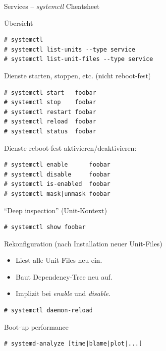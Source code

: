 \begin{frame}{Services --
  \emph{systemctl} Cheatsheet}
\begin{block}{Übersicht}
\begin{lstlisting}
# systemctl
# systemctl list-units --type service
# systemctl list-unit-files --type service
\end{lstlisting}
\end{block}

\begin{block}{Dienste starten, stoppen, etc. (nicht reboot-fest)}
\begin{lstlisting}
# systemctl start   foobar
# systemctl stop    foobar
# systemctl restart foobar
# systemctl reload  foobar
# systemctl status  foobar
\end{lstlisting}
\end{block}

\framebreak
\begin{block}{Dienste reboot-fest aktivieren/deaktivieren:}
\begin{lstlisting}
# systemctl enable      foobar
# systemctl disable     foobar
# systemctl is-enabled  foobar
# systemctl mask|unmask foobar
\end{lstlisting}
\end{block}

\begin{block}{``Deep inspection'' (Unit-Kontext)}
\begin{lstlisting}
# systemctl show foobar
\end{lstlisting}
\end{block}

\framebreak

\begin{block}{Rekonfiguration (nach Installation neuer Unit-Files)}
\begin{itemize}
\item Liest alle Unit-Files neu ein.
\item Baut Dependency-Tree neu auf.
\item Implizit bei \emph{enable} und \emph{disable}.
\end{itemize}
\begin{lstlisting}
# systemctl daemon-reload
\end{lstlisting}
\end{block}

\begin{block}{Boot-up performance}
\begin{lstlisting}
# systemd-analyze [time|blame|plot|...]
\end{lstlisting}
\end{block}
\end{frame}


